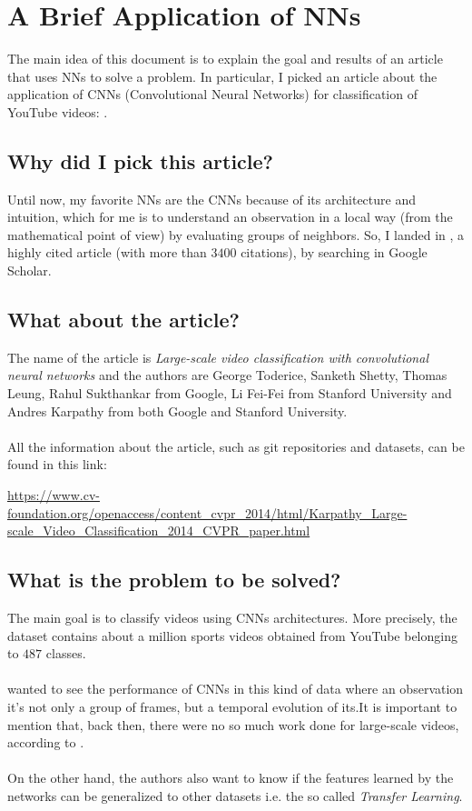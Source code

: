 \documentclass[12pt]{article}
\theoremstyle{plain}
\theoremstyle{definition}
\theoremstyle{definition}
\theoremstyle{definition}
\begin{document}
\section*{A Brief Application of NNs}
\noindent The main idea of this document is to explain the goal and results of an article that uses NNs to solve a problem. In particular, I picked an article about the application of CNNs  (Convolutional Neural Networks) for classification of YouTube videos: \cite{6909619}.     \subsection*{Why did I pick this article?}
\noindent Until now, my favorite NNs are the CNNs because of its architecture and intuition, which for me is to understand an observation in a local way (from the mathematical point of view) by evaluating groups of neighbors. So, I landed in \cite{6909619}, a highly cited article (with more than $3400$ citations), by searching in Google Scholar.   
\subsection*{What about the article?}
\noindent The name of the article is \textit{Large-scale video classification with convolutional neural networks} and the authors are George Toderice, Sanketh Shetty, Thomas Leung, Rahul Sukthankar from Google, Li Fei-Fei from Stanford University and Andres Karpathy from both Google and Stanford University.\\
\\
All the information about the article, such as git repositories and datasets, can be found in this link:
\begin{center}
\url{https://www.cv-foundation.org/openaccess/content_cvpr_2014/html/Karpathy_Large-scale_Video_Classification_2014_CVPR_paper.html}    
\end{center}
\subsection*{What is the problem to be solved?}
\noindent The main goal is to classify videos using CNNs architectures. More precisely, the dataset contains about a million sports videos obtained from YouTube belonging to $487$ classes.\\
\\ \cite{6909619} wanted to see the performance of CNNs in this kind of data where an observation it's not only a group of frames, but a temporal evolution of its.It is important to mention that, back then, there were no so much work done for large-scale videos, according to \cite{6909619}.\\
\\
On the other hand, the authors also want to know if the features learned by the networks can be generalized to other datasets i.e. the so called \textit{Transfer Learning}.
\end{document}
